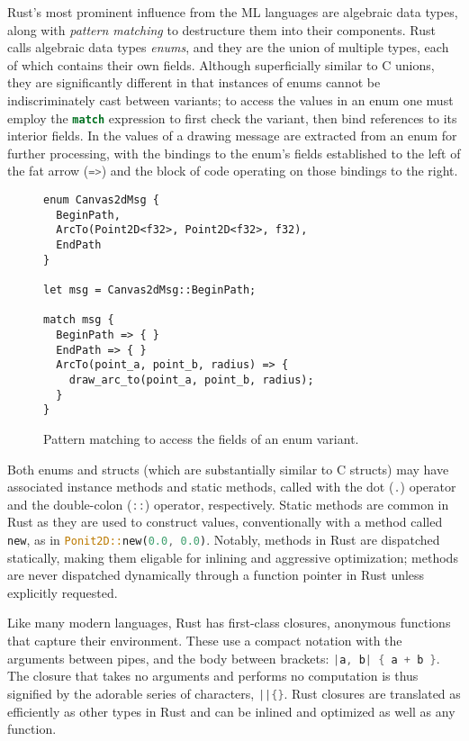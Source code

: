 Rust's most prominent influence from the ML languages are algebraic data types,
along with \emph{pattern matching} to destructure
them into their components. Rust calls algebraic data types \emph{enums},
and they are the union of multiple types,
each of which contains their own fields. Although superficially
similar to C unions, they are significantly different in that
instances of enums cannot be indiscriminately cast between
variants; to access the values in an enum one must employ the \lstinline[language=Rust]{match}
expression to first check the variant, then bind references
to its interior fields. In  the values of
a drawing message are extracted from an enum for further processing,
with the bindings to the enum's fields established to the left of the
fat arrow (\lstinline[language=Rust]{=>}) and the block of code operating
on those bindings to the right.

\begin{figure}
\begin{lstlisting}
enum Canvas2dMsg {
  BeginPath,
  ArcTo(Point2D<f32>, Point2D<f32>, f32),
  EndPath
}

let msg = Canvas2dMsg::BeginPath;

match msg {
  BeginPath => { }
  EndPath => { }
  ArcTo(point_a, point_b, radius) => {
    draw_arc_to(point_a, point_b, radius);
  }
}
\end{lstlisting}
  \caption{Pattern matching to access the fields of an enum variant.}
  \label{fig:enums}
\end{figure}

Both enums and structs (which are substantially similar to C structs)
may have associated instance methods and static methods, called with the dot
(\lstinline[language=Rust]{.}) operator and the double-colon
(\lstinline[language=Rust]{::}) operator, respectively.
Static methods are common in Rust as they are used to construct
values, conventionally with a method called
\lstinline[language=Rust]{new}, as in
\lstinline[language=Rust]{Ponit2D::new(0.0, 0.0)}.
Notably, methods in Rust are dispatched statically, making them
eligable for inlining and aggressive optimization; methods are never
dispatched dynamically through a function pointer in Rust unless
explicitly requested.

Like many modern languages, Rust has first-class closures,
anonymous functions that capture their environment. These
use a compact notation with the arguments between pipes,
and the body between brackets: \lstinline[language=Rust]~|a, b| { a + b }~.
The closure that takes no arguments and performs no computation is
thus signified by the adorable series of characters, \lstinline[language=Rust]~||{}~.
Rust closures are translated as efficiently as other types
in Rust and can be inlined and optimized as well as any function.


